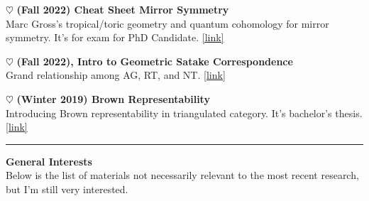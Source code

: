 \documentclass{article}
\begin{document}
\begin{minipage}{\textwidth}
\noindent
\begin{minipage}{\textwidth}
\noindent $\heartsuit$ \textbf{(Fall 2022) Cheat Sheet Mirror Symmetry} \\
Marc Gross’s tropical/toric geometry and quantum cohomology for mirror symmetry. It’s for exam for PhD Candidate.
\href{https://kojisunami.github.io/study_notes/qe2-major-ver3.pdf}{[link]}
\end{minipage}

\noindent
\begin{minipage}{\textwidth}
\noindent $\heartsuit$ \textbf{(Fall 2022), Intro to Geometric Satake Correspondence} \\
Grand relationship among AG, RT, and NT.
\href{https://kojisunami.github.io/study_notes/satake-ver2.pdf}{[link]}
\end{minipage}

\noindent
\begin{minipage}{\textwidth}
\noindent $\heartsuit$ \textbf{(Winter 2019) Brown Representability} \\
Introducing Brown representability in triangulated category. It’s bachelor’s thesis.
\href{https://kojisunami.github.io/study_notes/brt.pdf}{[link]}
\end{minipage}
\end{minipage}


\noindent\rule{\textwidth}{0.4pt}


\begin{minipage}{0.85\textwidth}
\noindent
\textbf{General Interests} \\

\noindent
Below is the list of materials not necessarily relevant to the most recent research, but I'm still very interested.

\end{minipage}
\end{document}

